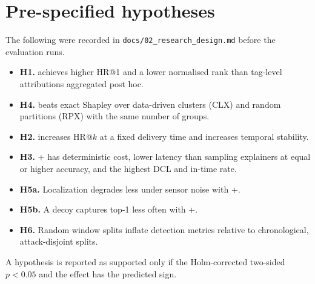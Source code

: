 \section{Pre-specified hypotheses}\label{app:design}
The following were recorded in \texttt{docs/02\_research\_design.md} before the evaluation runs.
\begin{itemize}
\item \textbf{H1.} \LX{} achieves higher HR@1 and a lower normalised rank than tag-level attributions aggregated post hoc.
\item \textbf{H4.} \LX{} beats exact Shapley over data-driven clusters (CLX) and random partitions (RPX) with the same number of groups.
\item \textbf{H2.} \TEA{} increases HR@$k$ at a fixed delivery time and increases temporal stability.
\item \textbf{H3.} \LX+\TEA{} has deterministic cost, lower latency than sampling explainers at equal or higher accuracy, and the highest DCL and in-time rate.
\item \textbf{H5a.} Localization degrades less under sensor noise with \LX+\TEA.
\item \textbf{H5b.} A decoy captures top-1 less often with \LX+\TEA.
\item \textbf{H6.} Random window splits inflate detection metrics relative to chronological, attack-disjoint splits.
\end{itemize}
A hypothesis is reported as supported only if the Holm-corrected two-sided $p<0.05$ and the effect has the predicted sign.

